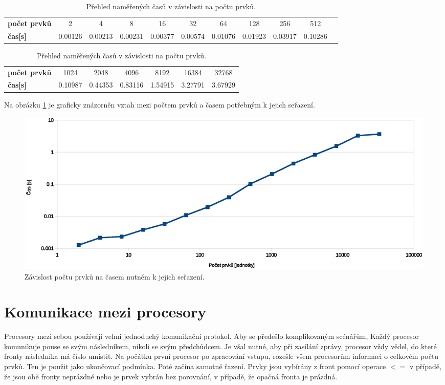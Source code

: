 \documentclass[a4paper, 10pt]{article}[5.10.2011]
\begin{document}
\begin{table}[ht]
\begin{center}
\begin{tabular}{ l | c c c c c c c c c c }
\hline
\textbf{počet prvků} & 2 & 4 & 8 & 16 & 32 & 64 & 128 & 256 & 512 \\
\textbf{čas[s]} & 0.00126 & 0.00213 & 0.00231 & 0.00377 & 0.00574 & 0.01076 & 0.01923 & 0.03917 & 0.10286 \\ \hline
\end{tabular}
\end{center}

\begin{center}
\begin{tabular}{ l | c c c c c c}
\hline
\textbf{počet prvků} & 1024 & 2048 & 4096 & 8192 & 16384 & 32768  \\
\textbf{čas[s]} & 0.10987 & 0.44353 & 0.83116 & 1.54915 & 3.27791 & 3.67929 \\ \hline
\end{tabular}
\caption{Přehled naměřených časů v závislosti na počtu prvků.}
\label{tab1}
\end{center}
\end{table}

Na obrázku \ref{pic1} je graficky znázorněn vztah mezi počtem prvků a časem potřebným k jejich seřazení.
\begin{figure}[ht]
\includegraphics[scale=.6]{1.eps}
\caption{Závislost počtu prvků na časem nutném k jejich seřazení.}
\label{pic1}
\end{figure}


\section{Komunikace mezi procesory}
Procesory mezi sebou používají velmi jednoduchý komunikační protokol. Aby se předešlo komplikovaným scénářům, Každý procesor komunikuje pouse se svým následníkem, nikoli se svým předchůdcem. Je všal nutné, aby při zasílání zprávy,
procesor vždy vědel, do které fronty následníka má číslo umístit. Na počátku první procesor po zpracování vstupu, rozešle všem procesorům informaci o celkovém počtu prvků. Ten je použit jako ukončovací podmínka. Poté začína samotné řazení. Prvky jsou vybírány z front pomocí operace $<=$ v případě, že jsou obě fronty neprázdné nebo je prvek vybrán bez porovnání, v případě, že opačná fronta je prázdná.
\end{document}

